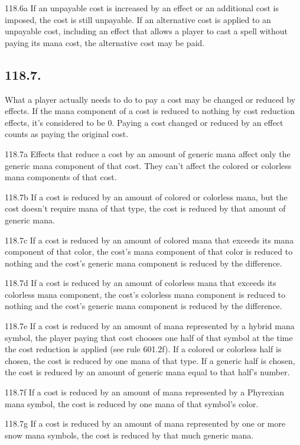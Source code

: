118.6a If an unpayable cost is increased by an effect or an additional cost is imposed, the cost is still unpayable. If an alternative cost is applied to an unpayable cost, including an effect that allows a player to cast a spell without paying its mana cost, the alternative cost may be paid.

\subsection*{118.7.}
What a player actually needs to do to pay a cost may be changed or reduced by effects. If the mana component of a cost is reduced to nothing by cost reduction effects, it’s considered to be {0}. Paying a cost changed or reduced by an effect counts as paying the original cost.

118.7a Effects that reduce a cost by an amount of generic mana affect only the generic mana component of that cost. They can’t affect the colored or colorless mana components of that cost.

118.7b If a cost is reduced by an amount of colored or colorless mana, but the cost doesn’t require mana of that type, the cost is reduced by that amount of generic mana.

118.7c If a cost is reduced by an amount of colored mana that exceeds its mana component of that color, the cost’s mana component of that color is reduced to nothing and the cost’s generic mana component is reduced by the difference.

118.7d If a cost is reduced by an amount of colorless mana that exceeds its colorless mana component, the cost’s colorless mana component is reduced to nothing and the cost’s generic mana component is reduced by the difference.

118.7e If a cost is reduced by an amount of mana represented by a hybrid mana symbol, the player paying that cost chooses one half of that symbol at the time the cost reduction is applied (see rule 601.2f). If a colored or colorless half is chosen, the cost is reduced by one mana of that type. If a generic half is chosen, the cost is reduced by an amount of generic mana equal to that half’s number.

118.7f If a cost is reduced by an amount of mana represented by a Phyrexian mana symbol, the cost is reduced by one mana of that symbol’s color.

118.7g If a cost is reduced by an amount of mana represented by one or more snow mana symbols, the cost is reduced by that much generic mana.


